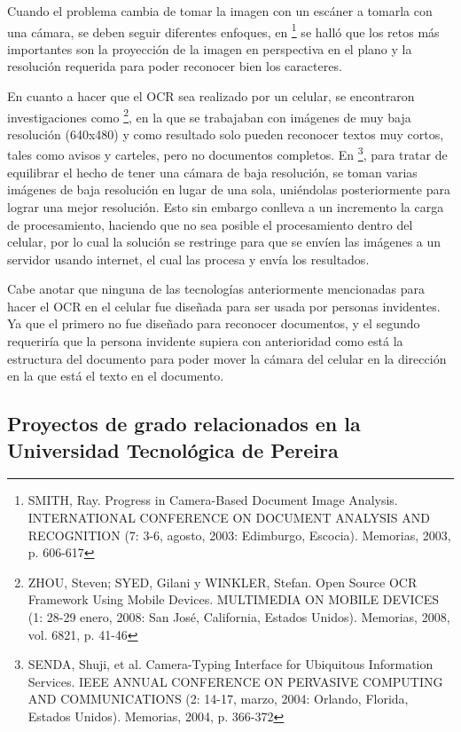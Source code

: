 \documentclass[a4paper, 11pt, oneside]{report}
\begin{document}
Cuando el problema cambia de tomar la imagen con un escáner a tomarla con una cámara, se deben seguir diferentes enfoques, en \footnote{SMITH, Ray. Progress in Camera-Based Document Image Analysis. INTERNATIONAL CONFERENCE ON DOCUMENT ANALYSIS AND RECOGNITION (7: 3-6, agosto, 2003: Edimburgo, Escocia). Memorias, 2003, p. 606-617} se halló que los retos más importantes son la proyección de la imagen en perspectiva en el plano y la  resolución requerida para poder reconocer bien los caracteres.

En cuanto a hacer que el OCR sea realizado por un celular, se encontraron investigaciones como \footnote{ZHOU, Steven; SYED, Gilani y WINKLER, Stefan. Open Source OCR Framework Using Mobile Devices. MULTIMEDIA ON MOBILE DEVICES (1: 28-29 enero, 2008: San José, California, Estados Unidos). Memorias, 2008, vol. 6821, p. 41-46}, en la que se trabajaban con imágenes de muy baja resolución (640x480) y como resultado solo pueden reconocer textos muy cortos, tales como avisos y carteles, pero no documentos completos. En \footnote{SENDA, Shuji, et al. Camera-Typing Interface for Ubiquitous Information Services. IEEE ANNUAL CONFERENCE ON PERVASIVE COMPUTING AND COMMUNICATIONS (2: 14-17, marzo, 2004: Orlando, Florida, Estados Unidos). Memorias, 2004, p. 366-372}, para tratar de equilibrar el hecho de tener una cámara de baja resolución, se toman varias imágenes de baja resolución en lugar de una sola, uniéndolas posteriormente para lograr una mejor resolución. Esto sin embargo conlleva a un incremento la carga de procesamiento, haciendo que no sea posible el procesamiento dentro del celular, por lo cual la solución se restringe para que se envíen las imágenes a un servidor usando internet, el cual las procesa y envía los resultados.

Cabe anotar que ninguna de las tecnologías anteriormente mencionadas para hacer el OCR en el celular fue diseñada para ser usada por personas invidentes. Ya que el primero no fue diseñado para reconocer documentos, y el segundo requeriría que la persona invidente supiera con anterioridad como está la estructura del documento para poder mover la cámara del celular en la dirección en la que está el texto en el documento.
	
\subsection{Proyectos de grado relacionados en la Universidad Tecnológica de Pereira}
\end{document}
